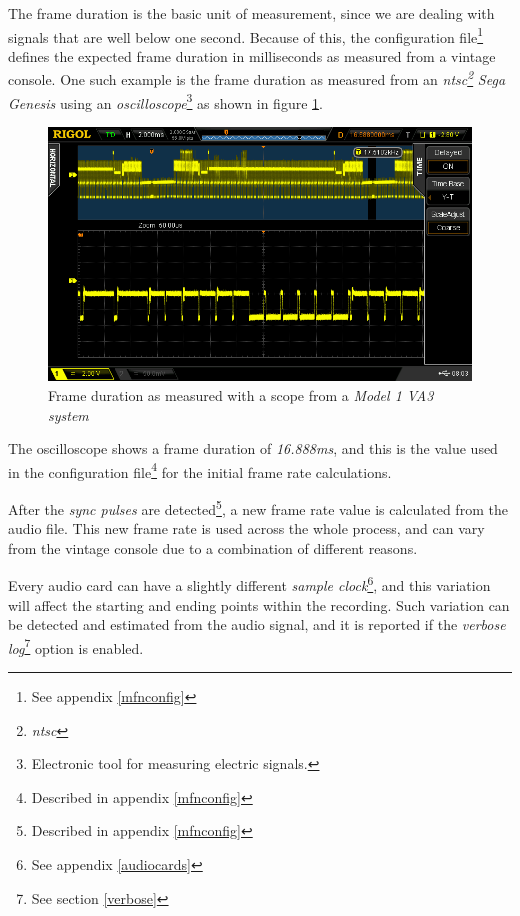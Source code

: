 \documentclass[10pt,a4paper]{report}
\newcommand{\define}[1]{
	\textit{\acrshort{#1}\footnote{\textit{\acrlong{#1}}}}}
\begin{document}
\begin{appendices}
The frame duration is the basic unit of measurement, since we are dealing with signals that are well below one second. Because of this, the configuration file\footnote{See appendix \ref{mfnconfig}} defines the expected frame duration in milliseconds as measured from a vintage console. One such example is the frame duration as measured from an \define{ntsc} \textit{Sega Genesis} using an \textit{oscilloscope}\footnote{Electronic tool for measuring electric signals.} as shown in figure \ref{fig:frameratescope}.

\begin{figure}[H]
	\centering
	\includegraphics[width=1.0\linewidth]{images/scope/framerate-scope.png}
	\caption[Scope frame rate]{Frame duration as measured with a scope from a \textit{Model 1 VA3 system}}
	\label{fig:frameratescope}
\end{figure}

The oscilloscope shows a frame duration of \textit{16.888ms}, and this is the value used in the configuration file\footnote{Described in appendix \ref{mfnconfig}} for the initial frame rate calculations.

After the \textit{sync pulses} are detected\footnote{Described in appendix \ref{mfnconfig}}, a new frame rate value is calculated from the audio file. This new frame rate is used across the whole process, and can vary from the vintage console due to a combination of different reasons.

Every audio card can have a slightly different \textit{sample clock}\footnote{See appendix \ref{audiocards}}, and this variation will affect the starting and ending points within the recording. Such variation can be detected and estimated from the audio signal, and it is reported if the \textit{verbose log}\footnote{See section \ref{verbose}} option is enabled.


\end{appendices}
\end{document}
